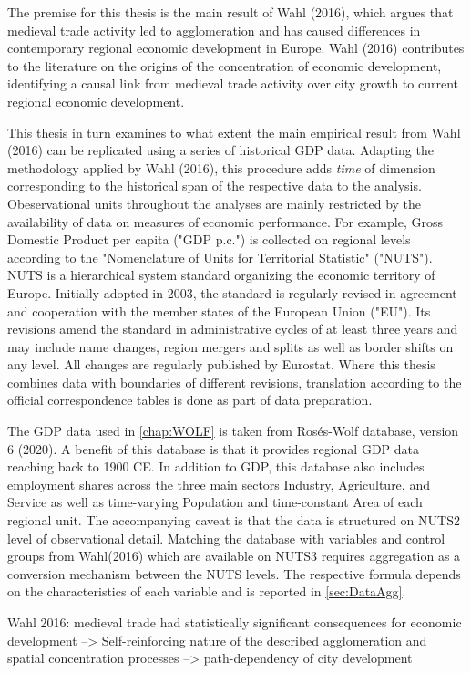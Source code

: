 \documentclass[
12pt, %
english, %
onehalfspacing, %
oneside,
headsepline, %
openany
]{MastersDoctoralThesis} %
\begin{document}
The premise for this thesis is the main result of Wahl (2016), which argues that medieval trade activity led to agglomeration and has caused differences in contemporary regional economic development in Europe. Wahl (2016) contributes to the literature on the origins of the concentration of economic development, identifying a causal link from medieval trade activity over city growth to current regional economic development. 

This thesis in turn examines to what extent the main empirical result from Wahl (2016) can be replicated using a series of historical GDP data. Adapting the methodology applied by Wahl (2016), this procedure adds \textit{time} of dimension corresponding to the historical span of the respective data to the analysis. Obeservational units throughout the analyses are mainly restricted by the availability of data on measures of economic performance. For example, Gross Domestic Product per capita ("GDP p.c.") is collected on regional levels according to the "Nomenclature of Units for Territorial Statistic" ("NUTS"). NUTS is a hierarchical system standard organizing the economic territory of Europe. Initially adopted in 2003, the standard is regularly revised in agreement and cooperation with the member states of the European Union ("EU"). Its revisions amend the standard in administrative cycles of at least three years and may include name changes, region mergers and splits as well as border shifts on any level. All changes are regularly published by Eurostat. Where this thesis combines data with boundaries of different revisions, translation according to the official correspondence tables is done as part of data preparation.

The GDP data used in \autoref{chap:WOLF} is taken from Rosés-Wolf database, version 6 (2020). A benefit of this database is that it provides regional GDP data reaching back to 1900 CE. In addition to GDP, this database also includes employment shares across the three main sectors Industry, Agriculture, and Service as well as time-varying Population and time-constant Area of each regional unit. The accompanying caveat is that the data is structured on NUTS2 level of observational detail. Matching the database with variables and control groups from Wahl(2016) which are available on NUTS3 requires aggregation as a conversion mechanism between the NUTS levels. The respective formula depends on the characteristics of each variable and is reported in \autoref{sec:DataAgg}.

Wahl 2016: medieval trade had statistically significant consequences for economic development --> Self-reinforcing nature of the described agglomeration and spatial concentration processes
--> path-dependency of city development
\end{document}
